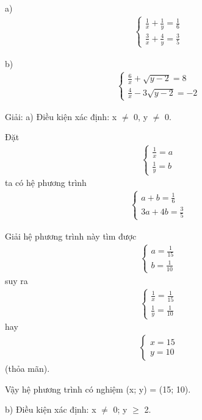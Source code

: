 \documentclass[%
    fontsize=12pt,%
    chapterprefix=false,%
    open=right,%
    twoside=false,%
    numbers=noenddot,%
    headings=optiontohead,%
    final,%
    DIV=15,%
    parskip=half %
]{scrbook}
\begin{document}
a) \begin{align*} \begin{cases} \frac{1}{x} + \frac{1}{y} = \frac{1}{6} \\ \frac{3}{x} + \frac{4}{y} = \frac{3}{5} \end{cases} \end{align*}

b) \begin{align*} \begin{cases} \frac{6}{x} + \sqrt{y - 2} = 8 \\ \frac{4}{x} - 3\sqrt{y - 2} = -2 \end{cases} \end{align*}

Giải: a) Điều kiện xác định: x $\neq$ 0, y $\neq$ 0.

Đặt \begin{align*} \begin{cases} \frac{1}{x} = a \\ \frac{1}{y} = b \end{cases} \end{align*} ta có hệ phương trình \begin{align*} \begin{cases} a + b = \frac{1}{6} \\ 3a + 4b = \frac{3}{5} \end{cases} \end{align*}

Giải hệ phương trình này tìm được \begin{align*} \begin{cases} a = \frac{1}{15} \\ b = \frac{1}{10} \end{cases} \end{align*} suy ra \begin{align*} \begin{cases} \frac{1}{x} = \frac{1}{15} \\ \frac{1}{y} = \frac{1}{10} \end{cases} \end{align*} hay \begin{align*} \begin{cases} x = 15 \\ y = 10 \end{cases} \end{align*} (thỏa mãn).

Vậy hệ phương trình có nghiệm (x; y) = (15; 10).

b) Điều kiện xác định: x $\neq$ 0; y $\geq$ 2.
\end{document}
